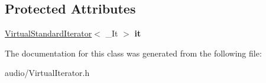 \subsection*{Protected Attributes}
\begin{DoxyCompactItemize}
\item 
\hyperlink{classAudio_1_1VirtualStandardIterator}{Virtual\+Standard\+Iterator}$<$ \+\_\+\+It $>$ {\bfseries it}\hypertarget{classAudio_1_1VirtualMappingIterator_ac2e79a9fb690bcb4285aa04c586e3282}{}\label{classAudio_1_1VirtualMappingIterator_ac2e79a9fb690bcb4285aa04c586e3282}

\end{DoxyCompactItemize}


The documentation for this class was generated from the following file\+:\begin{DoxyCompactItemize}
\item 
audio/Virtual\+Iterator.\+h\end{DoxyCompactItemize}
